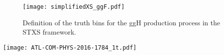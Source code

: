 \begin{enumerate}
\begin{figure}[htbp]
\centering
\texttt{[image: simplifiedXS\_ggF.pdf]}
\caption{\label{fig:org09ac44d}
Definition of the truth bins for the ggH production process in the STXS framework.}
\end{figure}

\begin{sidewaystable}
  \centering
  \texttt{[image: ATL-COM-PHYS-2016-1784\_1t.pdf]}
  

\end{sidewaystable}
\end{enumerate}
